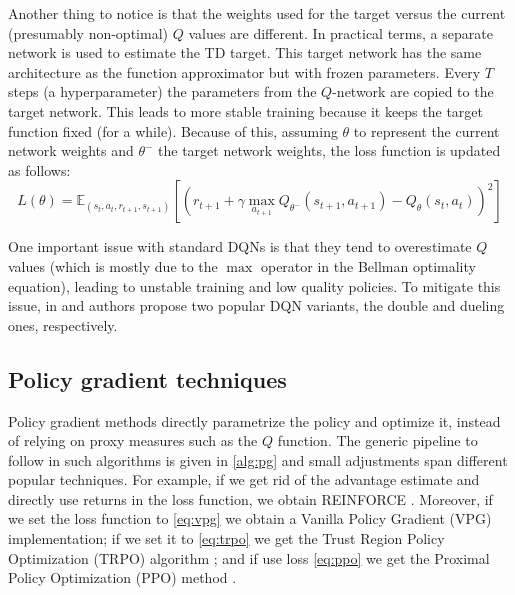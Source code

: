 \documentclass{article}
\begin{document}
Another thing to notice is that the weights used for the target versus the current (presumably non-optimal) $Q$ values are different. In practical terms, a separate network is used to estimate the TD target. This target network has the same architecture as the function approximator but with frozen parameters. Every $T$ steps (a hyperparameter) the parameters from the $Q$-network are copied to the target network. This leads to more stable training because it keeps the target function fixed (for a while). Because of this, assuming $\theta$ to represent the current network weights and $\theta^{-}$ the target network weights, the loss function is updated as follows:
$$
L(\theta)=\mathbb{E}_{(s_t,a_t,r_{t+1},s_{t+1})}\left[\left(r_{t+1}+\gamma\max_{a_{t+1}}Q_{\theta^{-}}(s_{t+1}, a_{t+1}) - Q_{\theta}(s_t, a_t)\right)^2\right]
$$

One important issue with standard DQNs is that they tend to overestimate $Q$ values (which is mostly due to the $\max$ operator in the Bellman optimality equation), leading to unstable training and low quality policies. To mitigate this issue, in \cite{double-dqn} and \cite{dueling-dqn} authors propose two popular DQN variants, the double and dueling ones, respectively.

\subsection{Policy gradient techniques}
Policy gradient methods directly parametrize the policy and optimize it, instead of relying on proxy measures such as the $Q$ function. The generic pipeline to follow in such algorithms is given in \ref{alg:pg} and small adjustments span different popular techniques. For example, if we get rid of the advantage estimate and directly use returns in the loss function, we obtain REINFORCE \cite{reinforce}. Moreover, if we set the loss function to \ref{eq:vpg} we obtain a Vanilla Policy Gradient (VPG) implementation; if we set it to \ref{eq:trpo} we get the Trust Region Policy Optimization (TRPO) algorithm \cite{trpo}; and if use loss \ref{eq:ppo} we get the Proximal Policy Optimization (PPO) method \cite{ppo}.
\end{document}
